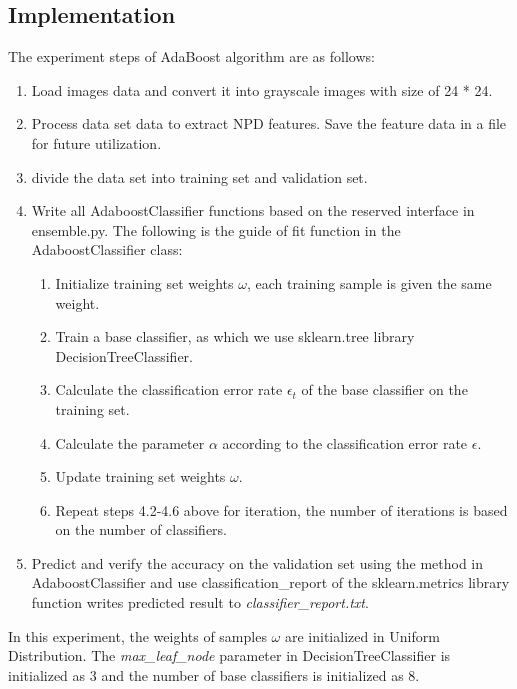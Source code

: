 \documentclass[journal, a4paper]{IEEEtran}
\begin{document}
\subsection{Implementation}
The experiment steps of AdaBoost algorithm are as follows:
\begin{enumerate}
  \item Load images data and convert it into grayscale images with size of 24 * 24.
  \item Process data set data to extract NPD features. Save the feature data in a file for future utilization.
  \item divide the data set into training set and validation set.
  \item Write all AdaboostClassifier functions based on the reserved interface in ensemble.py. The following is the guide of fit function in the AdaboostClassifier class:
      \begin{enumerate}
        \item Initialize training set weights $\omega$, each training sample is given the same weight.
        \item Train a base classifier, as which we use sklearn.tree library DecisionTreeClassifier.
        \item Calculate the classification error rate $\epsilon_t$ of the base classifier on the training set.
        \item Calculate the parameter $\alpha$ according to the classification error rate $\epsilon$.
        \item Update training set weights $\omega$.
        \item Repeat steps 4.2-4.6 above for iteration, the number of iterations is based on the number of classifiers.
      \end{enumerate}
  \item Predict and verify the accuracy on the validation set using the method in AdaboostClassifier and use classification\_report of the sklearn.metrics library function writes predicted result to \textit{classifier\_report.txt}.
\end{enumerate}

In this experiment, the weights of samples $\omega$ are initialized in Uniform Distribution. The \textit{max\_leaf\_node} parameter in DecisionTreeClassifier is initialized as 3 and the number of base classifiers is initialized as 8.
\end{document}
